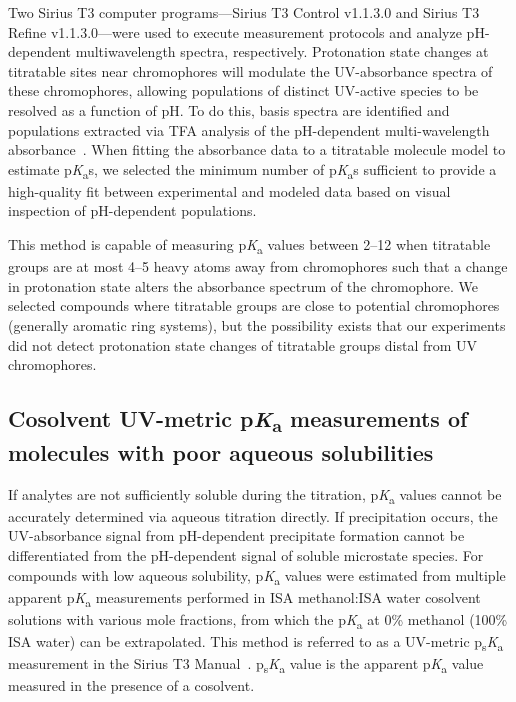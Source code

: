 \documentclass[9pt,lineno]{elife}
\newcommand{\pKa}{p\textit{K}\textsubscript{a}}
\newcommand{\psKa}{p\textsubscript{s}\textit{K}\textsubscript{a}}
\begin{document}
Two Sirius T3 computer programs---Sirius T3 Control v1.1.3.0 and Sirius T3 Refine v1.1.3.0---were used to execute measurement protocols and analyze pH-dependent multiwavelength spectra, respectively.
Protonation state changes at titratable sites near chromophores will modulate the UV-absorbance spectra of these chromophores, allowing populations of distinct UV-active species to be resolved as a function of pH. 
To do this, basis spectra are identified and populations extracted via TFA analysis of the pH-dependent multi-wavelength absorbance~\citep{allen_multiwavelength_1998}. 
When fitting the absorbance data to a titratable molecule model to estimate \pKa{}s, we selected the minimum number of \pKa{}s sufficient to provide a high-quality fit between experimental and modeled data based on visual inspection of pH-dependent populations.

This method is capable of measuring \pKa{} values between 2--12 when titratable groups are at most 4--5 heavy atoms away from chromophores such that a change in protonation state alters the absorbance spectrum of the chromophore. 
We selected compounds where titratable groups are close to potential chromophores (generally aromatic ring systems), but the possibility exists that our experiments did not detect protonation state changes of titratable groups distal from UV chromophores.

\subsection{Cosolvent UV-metric \pKa{} measurements of molecules with poor aqueous solubilities}

If analytes are not sufficiently soluble during the titration, \pKa{} values cannot be accurately determined via aqueous titration directly. 
If precipitation occurs, the UV-absorbance signal from pH-dependent precipitate formation cannot be differentiated from the pH-dependent signal of soluble microstate species. 
For compounds with low aqueous solubility, \pKa{} values were estimated from multiple apparent \pKa{} measurements performed in ISA methanol:ISA water cosolvent solutions with various mole fractions, from which the \pKa{} at 0\% methanol (100\% ISA water) can be extrapolated. 
This method is referred to as a UV-metric \psKa{} measurement in the Sirius T3 Manual~\citep{noauthor_sirius_2008}. \psKa{} value is the apparent \pKa{} value measured in the presence of a cosolvent.  
\end{document}
